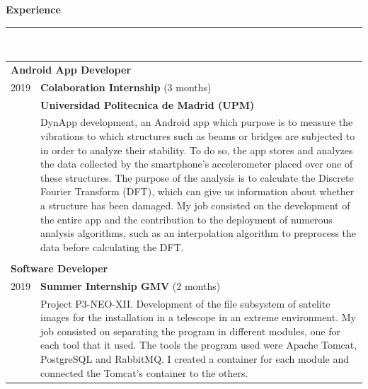 \documentclass{article}
\begin{document}
\begin{minipage}[t]{0.66\linewidth}
  \setlength{\parskip}{0.3em}

  \textbf{\Large{\color{BlueViolet}Experience}}\\[-0.25cm]
  {\color{BlueViolet} \rule{\linewidth}{0.1mm} }\\[-0.05cm]
  \begin{tabular}{l l}
    \multicolumn{2}{p{6cm}}{\hspace{0.40cm} \textbf{Android App Developer}}\\[0.1cm]
    2019 & \textbf{Colaboration Internship} (3 months)\\
         & \textbf{Universidad Politecnica de Madrid (UPM)} \\
         & \multicolumn{1}{p{11cm}}{DynApp development, an Android app which purpose is to measure the vibrations to which structures such as beams or bridges are subjected to in order to analyze their stability. To do so, the app stores and analyzes the data collected by the smartphone's accelerometer placed over one of these structures. The purpose of the analysis is to calculate the Discrete Fourier Transform (DFT), which can give us information about whether a structure has been damaged. My job consisted on the development of the entire app and the contribution to the deployment of numerous analysis algorithms, such as an interpolation algorithm to preprocess the data before calculating the DFT.}\\ \\[-0.1cm]
    \multicolumn{2}{p{6cm}}{\hspace{0.40cm} \textbf{Software Developer}}\\[0.1cm]
    2019 & \textbf{Summer Internship GMV} (2 months)\\
         & \multicolumn{1}{p{11cm}}{Project P3-NEO-XII. Development of the file subsystem of satelite images for the installation in a telescope in an extreme environment. My job consisted on separating the program in different modules, one for each tool that it used. The tools the program used were Apache Tomcat, PostgreSQL and RabbitMQ. I created a container for each module and connected the Tomcat's container to the others.} \\
  \end{tabular}
  \vspace{0.3cm}
  

\end{minipage}
\end{document}
